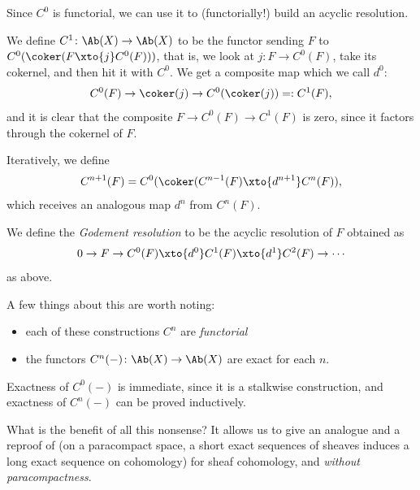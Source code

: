\documentclass[11pt]{book}
\begin{document}
Since $C^0$ is functorial, we can use it to (functorially!) build an acyclic resolution.

\begin{notation} We define $C^1 \colon \Ab(X) \to \Ab(X)$ to be the functor sending $F$ to $C^0(\coker(F \xto{j}C^0(F)))$, that is, we look at $j \colon F \to C^0(F)$, take its cokernel, and then hit it with $C^0$. We get a composite map which we call $d^0$:
\begin{align*}
    C^0(F) \to \coker(j) \to C^0(\coker(j)) =: C^1(F),
\end{align*}
and it is clear that the composite $F \to C^0(F) \to C^1(F)$ is zero, since it factors through the cokernel of $F$.

Iteratively, we define
\begin{align*}
    C^{n+1}(F) = C^0(\coker(C^{n-1}(F) \xto{d^{n+1}} C^n(F)),
\end{align*}
which receives an analogous map $d^n$ from $C^n(F)$.
\end{notation}

\begin{definition}\label{def:godement-resolution} 
We define the \textit{Godement resolution} to be the acyclic resolution of $F$ obtained as
\begin{align*}
    0 \to F \to C^0(F) \xto{d^0} C^1(F) \xto{d^1} C^2(F) \to \cdots 
\end{align*}
as above.
\end{definition}

\begin{remark} A few things about this are worth noting:
\begin{itemize}
    \item each of these constructions $C^n$ are \emph{functorial}
    \item the functors $C^n(-) \colon \Ab(X) \to \Ab(X)$ are exact for each $n$.
\end{itemize}
Exactness of $C^0(-)$ is immediate, since it is a stalkwise construction, and exactness of $C^n(-)$ can be proved inductively.
\end{remark}

What is the benefit of all this nonsense? It allows us to give an analogue and a reproof of  (on a paracompact space, a short exact sequences of sheaves induces a long exact sequence on cohomology) for sheaf cohomology, and \emph{without paracompactness}.
\end{document}
